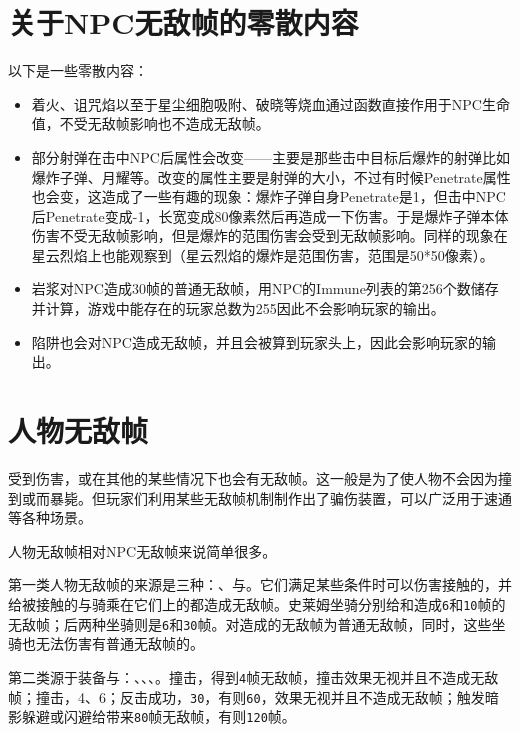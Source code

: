 \section{关于NPC无敌帧的零散内容}
以下是一些零散内容：
\begin{itemize}
\item 着火、诅咒焰以至于星尘细胞吸附、破晓等烧血通过函数直接作用于NPC生命值，不受无敌帧影响也不造成无敌帧。
\item 部分射弹在击中NPC后属性会改变——主要是那些击中目标后爆炸的射弹比如爆炸子弹、月耀等。改变的属性主要是射弹的大小，不过有时候Penetrate属性也会变，这造成了一些有趣的现象：爆炸子弹自身Penetrate是1，但击中NPC后Penetrate变成-1，长宽变成80像素然后再造成一下伤害。于是爆炸子弹本体伤害不受无敌帧影响，但是爆炸的范围伤害会受到无敌帧影响。同样的现象在星云烈焰上也能观察到（星云烈焰的爆炸是范围伤害，范围是50*50像素）。
\item 岩浆对NPC造成30帧的普通无敌帧，用NPC的Immune列表的第256个数储存并计算，游戏中能存在的玩家总数为255因此不会影响玩家的输出。
\item 陷阱也会对NPC造成无敌帧，并且会被算到玩家头上，因此会影响玩家的输出。
\end{itemize}

\section{人物无敌帧}
受到伤害，或在其他的某些情况下也会有无敌帧。这一般是为了使人物不会因为撞到或而暴毙。但玩家们利用某些无敌帧机制制作出了骗伤装置，可以广泛用于速通等各种场景。

人物无敌帧相对NPC无敌帧来说简单很多。

第一类人物无敌帧的来源是三种：、与。它们满足某些条件时可以伤害接触的，并给被接触的与骑乘在它们上的都造成无敌帧。史莱姆坐骑分别给和造成\lstinline{6}和\lstinline{10}帧的无敌帧；后两种坐骑则是\lstinline{6}和\lstinline{30}帧。对造成的无敌帧为普通无敌帧，同时，这些坐骑也无法伤害有普通无敌帧的。

第二类源于装备与：、、、。撞击，得到\lstinline{4}帧无敌帧，撞击效果无视并且不造成无敌帧；撞击，4、6；反击成功，\lstinline{30}，有则\lstinline{60}，效果无视并且不造成无敌帧；触发暗影躲避或闪避给带来\lstinline{80}帧无敌帧，有则\lstinline{120}帧。

